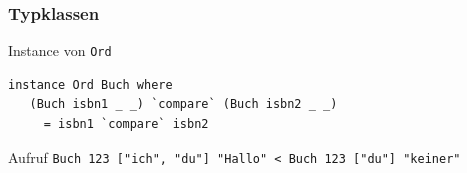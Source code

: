 \begin{frame}[fragile]
\frametitle{Typklassen}
\begin{block}{Instance von \lstinline|Ord|}
\begin{lstlisting}
instance Ord Buch where
   (Buch isbn1 _ _) `compare` (Buch isbn2 _ _) 
     = isbn1 `compare` isbn2
\end{lstlisting}
\end{block}
\begin{block}{Aufruf}
\lstinline|Buch 123 ["ich", "du"] "Hallo" < Buch 123 ["du"] "keiner"|
\end{block}
\end{frame}

